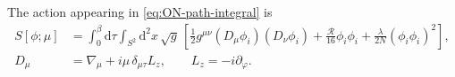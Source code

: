 \documentclass[a4paper,11pt]{article}
\newcommand{\dd}{\mathrm d}
\begin{document}
The action appearing in \eqref{eq:ON-path-integral} is
\begin{equation}
 \begin{aligned}
 S[\phi;\mu]
 &=\int_0^\beta\dd\tau\int_{S^2}\dd^2x\,\sqrt g\,
 \left[
 \frac12g^{\mu\nu}(D_\mu\phi_i)(D_\nu\phi_i)
 +\frac{\mathcal R}{16}\phi_i\phi_i
 +\frac{\lambda}{2N}(\phi_i\phi_i)^2
 \right],
 \\
 D_\mu&=\nabla_\mu+i\mu\,\delta_{\mu\tau}L_z,
 \qquad L_z=-i\partial_\varphi .
 \end{aligned}
 \label{eq:ON-mu-action}
\end{equation}
\\
\end{document}
